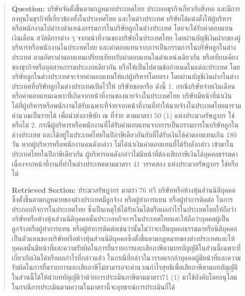\begin{quote}
    \begin{thai}
    \textbf{Question: } บริษัทจัดตั้งขึ้นตามกฎหมายประเทศไทย ประกอบธุรกิจเกี่ยวกับสิ่งทอ และมีการลงทุนในธุรกิจที่เกี่ยวข้องทั้งในประเทศไทย และในต่างประเทศ บริษัทได้แต่งตั้งให้ผู้บริหารหรือพนักงานไปดำรงตำแหน่งกรรมการในบริษัทลูกในต่างประเทศ โดยจะได้รับค่าตอบแทนเงินเดือน สวัสดิการต่าง ๆ จากหน้าที่งานของบริษัทในประเทศไทย โดยผ่านบัญชีเงินฝากของผู้บริหารหรือพนักงานในประเทศไทย และค่าตอบแทนจากการเป็นกรรมการในบริษัทลูกในต่างประเทศ ตามอัตราค่าตอบแทนเปรียบเทียบกับค่าตอบแทนในตำแหน่งเดียวกัน หรือเทียบเคียงของธุรกิจหรืออุตสาหกรรมประเภทเดียวกัน หรือให้เป็นไปตามข้อกำหนดในแต่ละประเทศ โดยบริษัทลูกในต่างประเทศจะจ่ายค่าตอบแทนให้แก่ผู้บริหารโดยตรง โดยผ่านบัญชีเงินฝากในต่างประเทศที่บริษัทลูกในต่างประเทศเปิดไว้ให้ บริษัทขอหารือ ดังนี้
1. กรณีบริษัทจ่ายเงินเดือนหรือค่าตอบแทนเฉพาะที่เกิดจากหน้าที่งานของนายจ้างในประเทศไทย บริษัทมีหน้าที่นำเงินได้ที่ผู้บริหารหรือพนักงานได้รับเฉพาะที่จ่ายจากหน้าที่งานที่ทำให้นายจ้างในประเทศไทยมารวมคำนวณเป็นรายได้ เพื่อนำส่งภาษีหัก ณ ที่จ่าย ตามมาตรา 50 (1) แห่งประมวลรัษฎากร ใช่หรือไม่
2. กรณีผู้บริหารหรือพนักงานที่ได้รับค่าตอบแทนจากการเป็นกรรมการในบริษัทลูกในต่างประเทศ และได้อยู่ในประเทศไทยในปีภาษีเดียวกันกับที่ได้รับเงินได้ค่าตอบแทนเกิน 180 วัน หากผู้บริหารหรือพนักงานคนดังกล่าว ไม่ได้นำเงินค่าตอบแทนที่ได้รับดังกล่าว เข้ามาในประเทศไทยในปีภาษีเดียวกัน ผู้บริหารคนดังกล่าวไม่มีหน้าที่ต้องเสียภาษีเงินได้บุคคลธรรมดาเนื่องจากหน้าที่งานที่ทำในต่างประเทศตามมาตรา 41 วรรคสอง แห่งประมวลรัษฎากร ใช่หรือไม่        
    
    \textbf{Retrieved Section: } ประมวลรัษฎากร มาตรา 76 ทวิ บริษัทหรือห้างหุ้นส่วนนิติบุคคลซึ่งตั้งขึ้นตามกฎหมายของต่างประเทศมีลูกจ้าง หรือผู้ทำการแทน หรือผู้ทำการติดต่อ ในการประกอบกิจการในประเทศไทย ซึ่งเป็นเหตุให้ได้รับเงินได้หรือผลกำไรในประเทศไทยให้ถือว่า บริษัทหรือห้างหุ้นส่วนนิติบุคคลนั้นประกอบกิจการในประเทศไทยและให้ถือว่าบุคคลผู้เป็นลูกจ้างหรือผู้ทำการแทน หรือผู้ทำการติดต่อเช่นว่านั้นไม่ว่าจะเป็นบุคคลธรรมดาหรือนิติบุคคลเป็นตัวแทนของบริษัทหรือห้างหุ้นส่วนนิติบุคคลซึ่งตั้งขึ้นตามกฎหมายของต่างประเทศและให้บุคคลนั้นมีหน้าที่และความรับผิดในการยื่นรายการและเสียภาษีตามบทบัญญัติในส่วนนี้เฉพาะที่เกี่ยวกับเงินได้หรือผลกำไรที่กล่าวแล้ว
ในกรณีที่กล่าวในวรรคแรกถ้าบุคคลผู้มีหน้าที่และความรับผิดในการยื่นรายการและเสียภาษีไม่สามารถจะคำนวณกำไรสุทธิเพื่อเสียภาษีตามบทบัญญัติในส่วนนี้ได้ให้นำบทบัญญัติว่าด้วยการประเมินภาษีตามมาตรา71 (1) มาใช้บังคับโดยอนุโลม
ในกรณีการประเมินตามความในมาตรานี้จะอุทธรณ์การประเมินก็ได้


    \end{thai}
\end{quote}

